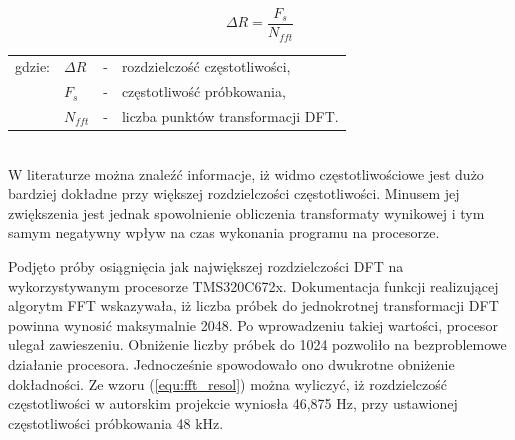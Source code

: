 \begin{equation} \label{equ:fft_resol}
\Delta R = \frac{F_{s}}{N_{fft}}
\end{equation}
\begin{tabular}{ l l l l}
	gdzie: 	&	$\Delta R$ & - &  rozdzielczość częstotliwości, \\
	&	$F_{s}$ & - &  częstotliwość próbkowania, \\
	&   $N_{fft}$ &  - & liczba punktów transformacji DFT. \\
\end{tabular} \\

W literaturze można znaleźć informacje, iż widmo częstotliwościowe jest dużo bardziej dokładne przy większej rozdzielczości częstotliwości. Minusem jej zwiększenia jest jednak spowolnienie obliczenia transformaty wynikowej i tym samym negatywny wpływ na czas wykonania programu na procesorze.

Podjęto próby osiągnięcia jak największej rozdzielczości DFT na wykorzystywanym procesorze TMS320C672x. Dokumentacja funkcji realizującej algorytm FFT wskazywała, iż liczba próbek do jednokrotnej transformacji DFT powinna wynosić maksymalnie 2048. Po wprowadzeniu takiej wartości, procesor ulegał zawieszeniu. Obniżenie liczby próbek do 1024 pozwoliło na bezproblemowe działanie procesora. Jednocześnie spowodowało ono dwukrotne obniżenie dokładności. Ze wzoru (\ref{equ:fft_resol}) można wyliczyć, iż rozdzielczość częstotliwości w autorskim projekcie wyniosła 46,875 Hz, przy ustawionej częstotliwości próbkowania 48 kHz.


